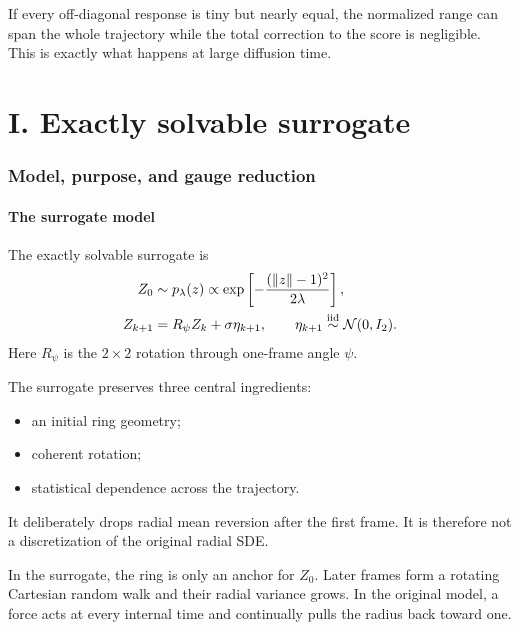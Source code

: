 \documentclass[11pt,a4paper]{article}
\newcommand{\N}{\mathcal{N}}
\begin{document}
\begin{caution}
If every off-diagonal response is tiny but nearly equal, the normalized range can span the whole trajectory while the total correction to the score is negligible. This is exactly what happens at large diffusion time.
\end{caution}

\part{I. Exactly solvable surrogate}

\section{Model, purpose, and gauge reduction}

\subsection{The surrogate model}

The exactly solvable surrogate is
\begin{align}
 Z_0&\sim p_\lambda(z)\propto
 \exp\left[-\frac{(\|z\|-1)^2}{2\lambda}\right],
 \label{eq:surrogate-prior}\\
 Z_{k+1}&=R_\psi Z_k+\sigma\eta_{k+1},
 \qquad \eta_{k+1}\stackrel{\rm iid}{\sim}\N(0,I_2).
 \label{eq:surrogate-dynamics}
\end{align}
Here $R_\psi$ is the $2\times2$ rotation through one-frame angle $\psi$.

The surrogate preserves three central ingredients:
\begin{itemize}
\item an initial ring geometry;
\item coherent rotation;
\item statistical dependence across the trajectory.
\end{itemize}
It deliberately drops radial mean reversion after the first frame. It is therefore not a discretization of the original radial SDE.

\begin{caution}
In the surrogate, the ring is only an anchor for $Z_0$. Later frames form a rotating Cartesian random walk and their radial variance grows. In the original model, a force acts at every internal time and continually pulls the radius back toward one.
\end{caution}
\end{document}
